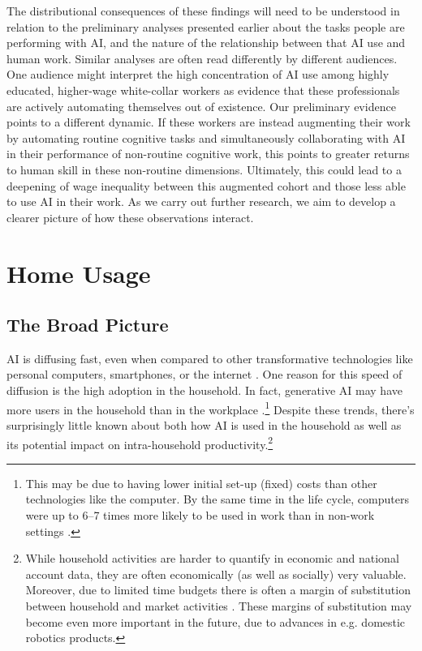 \documentclass[11pt,a4paper]{article}
\begin{document}
The distributional consequences of these findings will need to be understood in relation to the preliminary analyses presented earlier about the tasks people are performing with AI, and the nature of the relationship between that AI use and human work. Similar analyses are often read differently by different audiences. One audience might interpret the high concentration of AI use among highly educated, higher-wage white-collar workers as evidence that these professionals are actively automating themselves out of existence. Our preliminary evidence points to a different dynamic. If these workers are instead augmenting their work by automating routine cognitive tasks and simultaneously collaborating with AI in their performance of non-routine cognitive work, this points to greater returns to human skill in these non-routine dimensions. Ultimately, this could lead to a deepening of wage inequality between this augmented cohort and those less able to use AI in their work. As we carry out further research, we aim to develop a clearer picture of how these observations interact.


\section{Home Usage}
\label{sec:home_usage}
\subsection{The Broad Picture}

AI is diffusing fast, even when compared to other transformative technologies like personal computers, smartphones, or the internet  \citep{Bick2026, KalyaniQJE, sajadieh2026, curtomillet2026reflections}. One reason for this speed of diffusion is the high adoption in the household. In fact, generative AI may have more users in the household than in the workplace \citep{NBERw32966}.\footnote{This may be due to having lower initial set-up (fixed) costs than other technologies like the computer. By the same time in the life cycle, computers were up to 6--7 times more likely to be used in work than in non-work settings \citep{NBERw32966}.} Despite these trends, there's surprisingly little known about both how AI is used in the household as well as its potential impact on intra-household productivity.\footnote{While household activities are harder to quantify in economic and national account data, they are often economically (as well as socially) very valuable. Moreover, due to limited time budgets there is often a margin of substitution between household and market activities \citep{becker1965, cb816db9-bac3-3b58-9c7d-1751b51fc3f2, Coyle2018}. These margins of substitution may become even more important in the future, due to advances in e.g. domestic robotics products.}
\end{document}
